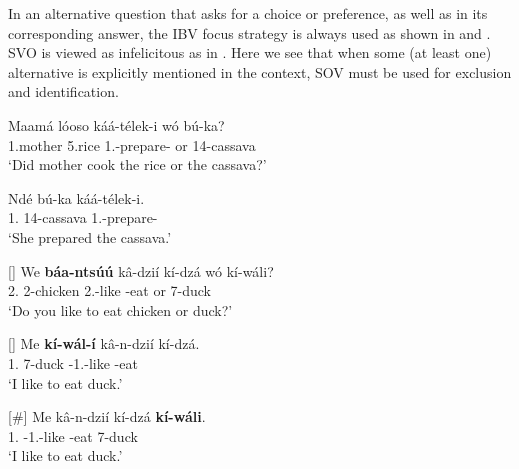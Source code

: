 \documentclass[output=paper,colorlinks,citecolor=brown,
]{langscibook}
\begin{document}
In an alternative question that asks for a choice or preference, as well as in its corresponding answer, the IBV focus strategy is always used as shown in  and . SVO is viewed as infelicitous as in . Here we see that when some (at least one) alternative is explicitly mentioned in the context, SOV must be used for exclusion and identification.
\begin{exe}
    \ex \label{22}
    \begin{xlist}
\ex
\label{22a}
\gll
Maamá lóoso káá-télek-i wó bú-ka?\\
1.mother 5.rice 1\Sm{}.\Pst{}-prepare-\Pst{} or 14-cassava\\
\trans ‘Did mother cook the rice or the cassava?’

\ex
\label{22b}
\gll
Ndé bú-ka káá-télek-i.\\
1.\Pro{} 14-cassava 1\Sm{}.\Pst{}-prepare-\Pst{}\\
\trans ‘She prepared the cassava.’

    \end{xlist}
\end{exe}
\begin{exe}
    \ex \label{23}
    \begin{xlist}
\ex
[]{
\label{23a}
\gll
We \textbf{báa-ntsúú} k\^{a}-dzií kí-dzá wó kí-wáli?\\
2\Sg{}.\Pro{} 2-chicken 2\Sg{}.\Prs{}-like \Inf{}-eat or 7-duck\\
\trans ‘Do you like to eat chicken or duck?’
}

\ex
[]{
\label{23b}
\gll
Me \textbf{kí-wál-í} k\^{a}-n-dzií kí-dzá.\\
1\Sg{}.\Pro{} 7-duck \Prs{}-1\Sg{}.\Sm{}-like \Inf{}-eat \\
\trans ‘I like to eat duck.’
}

\ex
[\#]{
\label{23c}
\gll
Me k\^{a}-n-dzií kí-dzá \textbf{kí-wáli}.\\
1\Sg{}.\Pro{} \Prs{}-1\Sg{}.\Sm{}-like \Inf{}-eat 7-duck \\
\trans ‘I like to eat duck.’
}

    \end{xlist}
\end{exe}
\end{document}
